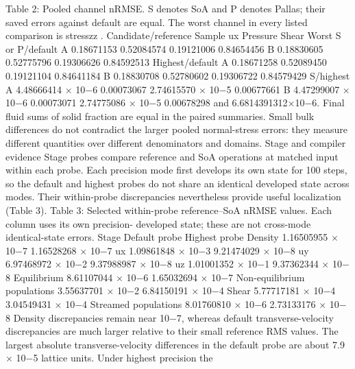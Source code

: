 \documentclass[11pt]{article}
\begin{document}
Table 2: Pooled channel nRMSE. S denotes SoA and P denotes Pallas; their saved errors against
default are equal. The worst channel in every listed comparison is stresszz .
Candidate/reference Sample ux Pressure Shear Worst
S or P/default A 0.18671153 0.52084574 0.19121006 0.84654456
B 0.18830605 0.52775796 0.19306626 0.84592513
Highest/default A 0.18671258 0.52089450 0.19121104 0.84641184
B 0.18830708 0.52780602 0.19306722 0.84579429
S/highest A 4.48666414 \ensuremath{\times} 10\ensuremath{-}6 0.00073067 2.74615570 \ensuremath{\times} 10\ensuremath{-}5 0.00677661
B 4.47299007 \ensuremath{\times} 10\ensuremath{-}6 0.00073071 2.74775086 \ensuremath{\times} 10\ensuremath{-}5 0.00678298
and 6.6814391312\ensuremath{\times}10\ensuremath{-}6. Final fluid sums of solid fraction are equal in the paired summaries. Small
bulk differences do not contradict the larger pooled normal-stress errors: they measure different
quantities over different denominators and domains.
Stage and compiler evidence
Stage probes compare reference and SoA operations at matched input within each probe. Each
precision mode first develops its own state for 100 steps, so the default and highest probes do
not share an identical developed state across modes. Their within-probe discrepancies nevertheless
provide useful localization (Table 3).
Table 3: Selected within-probe reference–SoA nRMSE values. Each column uses its own precision-
developed state; these are not cross-mode identical-state errors.
Stage Default probe Highest probe
Density 1.16505955 \ensuremath{\times} 10\ensuremath{-}7 1.16528268 \ensuremath{\times} 10\ensuremath{-}7
ux 1.09861848 \ensuremath{\times} 10\ensuremath{-}3 9.21474029 \ensuremath{\times} 10\ensuremath{-}8
uy 6.97468972 \ensuremath{\times} 10\ensuremath{-}2 9.37988987 \ensuremath{\times} 10\ensuremath{-}8
uz 1.01001352 \ensuremath{\times} 10\ensuremath{-}1 9.37362344 \ensuremath{\times} 10\ensuremath{-}8
Equilibrium 8.61107044 \ensuremath{\times} 10\ensuremath{-}6 1.65032694 \ensuremath{\times} 10\ensuremath{-}7
Non-equilibrium populations 3.55637701 \ensuremath{\times} 10\ensuremath{-}2 6.84150191 \ensuremath{\times} 10\ensuremath{-}4
Shear 5.77717181 \ensuremath{\times} 10\ensuremath{-}4 3.04549431 \ensuremath{\times} 10\ensuremath{-}4
Streamed populations 8.01760810 \ensuremath{\times} 10\ensuremath{-}6 2.73133176 \ensuremath{\times} 10\ensuremath{-}8
Density discrepancies remain near 10\ensuremath{-}7, whereas default transverse-velocity discrepancies are
much larger relative to their small reference RMS values. The largest absolute transverse-velocity
differences in the default probe are about 7.9 \ensuremath{\times} 10\ensuremath{-}5 lattice units. Under highest precision the
\end{document}
